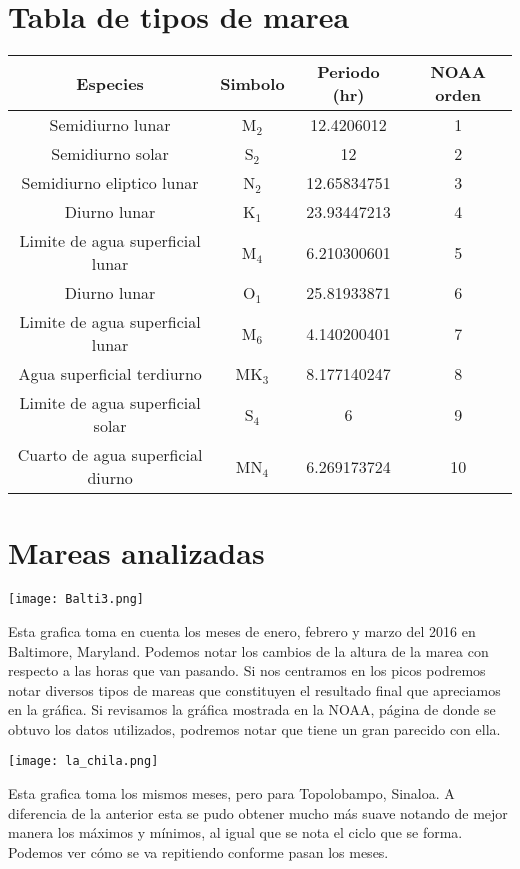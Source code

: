 \documentclass[a4paper,12pt]{article}
\begin{document}
\section{Tabla de tipos de marea}

\begin{center}
\begin{tabular}{|c|c|c|c|}
\hline
Especies & Simbolo & Periodo (hr) & NOAA orden \\ \hline
Semidiurno lunar & M$_2$ & 12.4206012 & 1 \\ \hline
Semidiurno solar & S$_2$ & 12 & 2\\ \hline
Semidiurno eliptico lunar & N$_2$ & 12.65834751 & 3\\ \hline
Diurno lunar & K$_1$ & 23.93447213 & 4\\ \hline
Limite de agua superficial lunar & M$_4$ & 6.210300601 & 5\\ \hline
Diurno lunar & O$_1$ & 25.81933871 & 6\\ \hline
Limite de agua superficial lunar & M$_6$ & 4.140200401 & 7\\ \hline
Agua superficial terdiurno & MK$_3$ & 8.177140247 & 8\\ \hline
Limite de agua superficial solar & S$_4$ & 6 & 9\\ \hline
Cuarto de agua superficial diurno & MN$_4$ & 6.269173724 & 10\\
\hline
\end{tabular}
\end{center}
\section{Mareas analizadas}
\begin{center}
\texttt{[image: Balti3.png]}
\end{center}

\noindent
Esta grafica toma en cuenta los meses de enero, febrero y marzo del 2016 en Baltimore, Maryland. Podemos notar los cambios de la altura de la marea con respecto a las horas que van pasando. Si nos centramos en los picos podremos notar diversos tipos de mareas que constituyen el resultado final que apreciamos en la gráfica. Si revisamos la gráfica mostrada en la NOAA, página de donde se obtuvo los datos utilizados, podremos notar que tiene un gran parecido con ella.

\begin{center}
\texttt{[image: la\_chila.png]}
\end{center}

\noindent
Esta grafica toma los mismos meses, pero para Topolobampo, Sinaloa. A diferencia de la anterior esta se pudo obtener mucho más suave notando de mejor manera los máximos y mínimos, al igual que se nota el ciclo que se forma. Podemos ver cómo se va repitiendo conforme pasan los meses.
\end{document}
